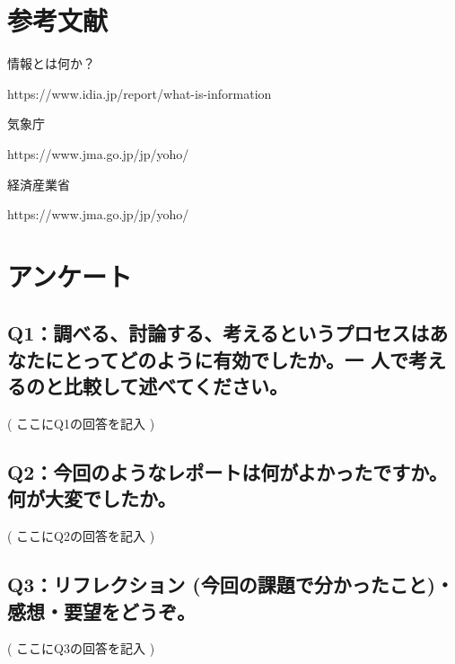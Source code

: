 \documentclass[12pt,a4j]{jarticle}
\begin{document}
\section{参考文献}

情報とは何か？

https://www.idia.jp/report/what-is-information

気象庁

https://www.jma.go.jp/jp/yoho/

経済産業省

https://www.jma.go.jp/jp/yoho/

\section{アンケート}

\subsection{Q1：調べる、討論する、考えるというプロセスはあなたにとってどのように有効でしたか。一 人で考えるのと比較して述べてください。}
( ここにQ1の回答を記入 )

\subsection{Q2：今回のようなレポートは何がよかったですか。何が大変でしたか。}
( ここにQ2の回答を記入 )

\subsection{Q3：リフレクション (今回の課題で分かったこと)・感想・要望をどうぞ。}
( ここにQ3の回答を記入 )
\end{document}
